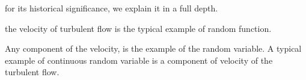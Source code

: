 for its historical significance, we explain it in a full depth.

the velocity of turbulent flow is the typical example of random function.

Any component of the velocity, is the example of the random variable.
A typical example of continuous random variable is a component of velocity of the turbulent flow.